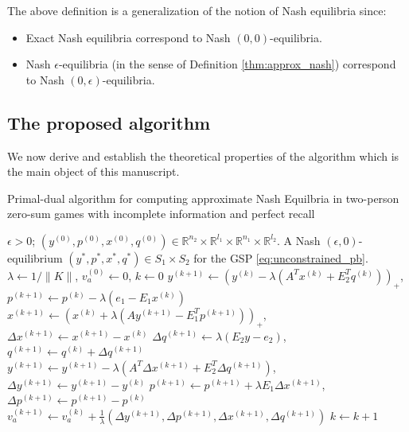 \documentclass{article} %
\begin{document}
The above definition is a generalization of the notion of Nash
equilibria since:
\begin{itemize}
\item Exact Nash equilibria correspond to Nash $(0,0)$-equilibria.
\item Nash $\epsilon$-equilibria (in the sense of Definition
  \ref{thm:approx_nash}) correspond to Nash $(0,\epsilon)$-equilibria.
\end{itemize}


\subsection{The proposed algorithm}
\label{sec:algo}
We now derive and establish the theoretical properties of the
algorithm which is the main object of this manuscript.

\begin{algorithm}
\caption{Primal-dual algorithm for computing approximate Nash
  Equilbria in two-person zero-sum games with incomplete information
  and perfect recall}
\label{Tab:algo}
\begin{algorithmic}[1]
\Require $\epsilon > 0$; $(y^{(0)},p^{(0)},x^{(0)},q^{(0)})
\in \mathbb{R}^{n_2}
  \times \mathbb{R}^{l_1} \times \mathbb{R}^{n_1} \times
  \mathbb{R}^{l_2}$.
\Ensure A Nash $(\epsilon,0)$-equilibrium
$({y^*},{p^*},{x^*},{q^*}) \in S_1 \times S_2$ for
the GSP \eqref{eq:unconstrained_pb}.
\State  $\lambda \leftarrow 1/\|K\|$, ${v}_a^{(0)} \leftarrow 0$, $k
\leftarrow 0$
\State $y^{(k + 1)} \leftarrow (y^{(k)} - \lambda (A^Tx^{(k)} +
E_2^Tq^{(k)}))_+$, \hspace{.5em}$p^{(k+1)} \leftarrow p^{(k)} -
\lambda(e_1-E_1x^{(k)})$
\State $x^{(k + 1)} \leftarrow (x^{(k)} + \lambda (Ay^{(k+1)} -
E_1^Tp^{(k+1)}))_+$, \hspace{.5em}$\Delta x^{(k+1)} \leftarrow
x^{(k+1)}-x^{(k)}$
\State $\Delta q^{(k+1)} \leftarrow \lambda (E_2y -
e_2)$, \hspace{.5em}$q^{(k+1)} \leftarrow q^{(k)} + \Delta q^{(k+1)}$
\State $y^{(k+1)} \leftarrow y^{(k+1)} - \lambda (A^T\Delta x^{(k+1)}
+ E_2^T\Delta q^{(k+1)})$, \hspace{.5em}$\Delta y^{(k+1)} \leftarrow
y^{(k+1)}-y^{(k)}$
\State $p^{(k+1)} \leftarrow p^{(k+1)} + \lambda E_1\Delta x^{(k+1)}$,
\hspace{.5em} $\Delta p^{(k+1)} \leftarrow p^{(k+1)}-p^{(k)}$
\State ${v}_a^{(k+1)} \leftarrow {v}_a^{(k)} +
\frac{1}{\lambda}(\Delta
y^{(k+1)},\Delta p^{(k+1)},\Delta x^{(k+1)},\Delta q^{(k+1)})$
\State $k \leftarrow k + 1$
\EndWhile
\end{algorithmic}
\end{algorithm}
\end{document}
